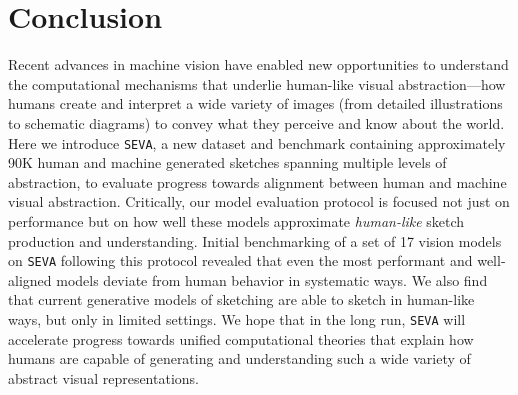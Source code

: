 \documentclass{article}
\begin{document}

\section{Conclusion}
Recent advances in machine vision have enabled new opportunities to understand the computational mechanisms that underlie human-like visual abstraction---how humans create and interpret a wide variety of images (from detailed illustrations to schematic diagrams) to convey what they perceive and know about the world. 
Here we introduce \texttt{SEVA}, a new dataset and benchmark containing approximately 90K human and machine generated sketches spanning multiple levels of abstraction, to evaluate progress towards alignment between human and machine visual abstraction. 
Critically, our model evaluation protocol is focused not just on performance but on how well these models approximate \textit{human-like} sketch production and understanding.
Initial benchmarking of a set of 17 vision models on \texttt{SEVA} following this protocol revealed that even the most performant and well-aligned models deviate from human behavior in systematic ways.
We also find that current generative models of sketching are able to sketch in human-like ways, but only in limited settings. 
We hope that in the long run, \texttt{SEVA} will accelerate progress towards unified computational theories that explain how humans are capable of generating and understanding such a wide variety of abstract visual representations.
\end{document}
